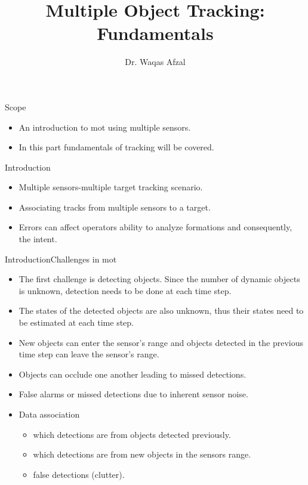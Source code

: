 \documentclass{beamer}
\title{Multiple Object Tracking: Fundamentals}
\author{Dr. Waqas Afzal}
\begin{document}
\begin{frame}[plain]
    \maketitle
\end{frame}
\begin{frame}{Scope}
	\begin{itemize}
		\item An introduction to \gls{mot} using multiple sensors.
		\item In this part fundamentals of tracking will be covered.
	\end{itemize}
\end{frame}
\begin{frame}{Introduction}
	\begin{itemize}
		\item Multiple sensors-multiple target tracking scenario.
		\item Associating tracks from multiple sensors to a target.
		\item Errors can affect operators ability to analyze formations and consequently, the intent.
	\end{itemize}
\end{frame}
\begin{frame}{Introduction}{Challenges in \gls{mot}}	
	\begin{itemize}
		\item The first challenge is detecting objects. Since the number of dynamic objects is unknown, detection needs to be done at each time step.
		\item The states of the detected objects are also unknown, thus their states need to be estimated at each time step.
		\item New objects can enter the sensor’s range and objects detected in the previous time step can leave the sensor’s range.
		\item Objects can occlude one another leading to missed detections.
		\item False alarms or missed detections due to inherent sensor noise.
		\item Data association
		\begin{itemize}
			\item which detections are from objects detected previously.
			\item which detections are from new objects in the sensors range.
			\item false detections (clutter).
		\end{itemize}
	\end{itemize}
\end{frame}
\end{document}
